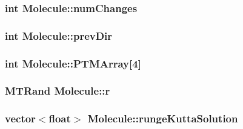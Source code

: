 \label{classMolecule_a4eafa2831869e116f64c86987f1cac81}
\hypertarget{classMolecule_a526a58eb943156887bb75b24bdb2b8a0}{
\subsubsection[{numChanges}]{\setlength{\rightskip}{0pt plus 5cm}int {\bf Molecule::numChanges}}}
\label{classMolecule_a526a58eb943156887bb75b24bdb2b8a0}
\hypertarget{classMolecule_acefb24656feeb161148e9594db6ada0b}{
\subsubsection[{prevDir}]{\setlength{\rightskip}{0pt plus 5cm}int {\bf Molecule::prevDir}}}
\label{classMolecule_acefb24656feeb161148e9594db6ada0b}
\hypertarget{classMolecule_ae6aff39305dd77531ea5a213b6f2b1c5}{
\subsubsection[{PTMArray}]{\setlength{\rightskip}{0pt plus 5cm}int {\bf Molecule::PTMArray}\mbox{[}4\mbox{]}}}
\label{classMolecule_ae6aff39305dd77531ea5a213b6f2b1c5}
\hypertarget{classMolecule_af036bbaa1f3ec537d3711ae3242d3074}{
\subsubsection[{r}]{\setlength{\rightskip}{0pt plus 5cm}MTRand {\bf Molecule::r}}}
\label{classMolecule_af036bbaa1f3ec537d3711ae3242d3074}
\hypertarget{classMolecule_a3e3be6cd7b1286e8d8d489642ab19641}{
\subsubsection[{rungeKuttaSolution}]{\setlength{\rightskip}{0pt plus 5cm}vector$<$float$>$ {\bf Molecule::rungeKuttaSolution}}}
